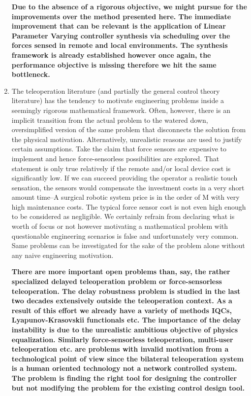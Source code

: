 \begin{enumerate}
    {\bfseries Due to the absence of a rigorous objective, we might pursue for the improvements over the method presented here. The 
    immediate improvement that can be relevant is the application of Linear Parameter Varying controller synthesis via scheduling over the 
    forces sensed in remote and local environments. The synthesis framework is already established however once again, the performance 
    objective is missing therefore we hit the same bottleneck. 
    }
    \item The teleoperation literature (and partially the general control theory literature) has the tendency to motivate engineering 
    problems inside a seemingly rigorous mathematical framework. Often, however, there is an implicit transition from the actual problem to 
    the watered down, oversimplified version of the same problem that disconnects the solution from the physical motivation. Alternatively, 
    unrealistic reasons are used to justify certain assumptions. Take the claim that force sensors are expensive to implement and hence 
    force-sensorless possibilities are explored. That statement is only true relatively if the remote and/or local device cost is 
    significantly low. If we can succeed providing the operator a realistic touch sensation, the sensors would compensate the investment 
    costs in a very short amount time--A surgical robotic system price is in the order of M\EUR{} with very high maintenance 
    costs. The typical force sensor cost is not even high enough to be considered as negligible. We certainly refrain from declaring what 
    is worth of focus or not however motivating a mathematical problem with questionable engineering scenarios is false and unfortunately 
    very common. Same problems can be investigated for the sake of the problem alone without any naive engineering motivation.
    
    {\bfseries There are more important open problems than, say, the rather specialized delayed teleoperation problem or force-sensorless 
    teleoperation. The delay robustness problem is studied in the last two decades extensively outside the teleoperation context. As a result 
    of this effort we already have a variety of methods IQCs, Lyapunov-Krasovskii functionals etc. The importance of the delay instability is 
    due to the unrealistic ambitious objective of physics equalization. Similarly force-sensorless teleoperation, multi-user teleoperation 
    etc. are problems with invalid motivation from a technological point of view since the bilateral teleoperation system is a human oriented
    technology not a network controlled system. The problem is finding the right tool for designing the controller but not modifying the 
    problem for the existing control design tool.
    }
    
\end{enumerate}


